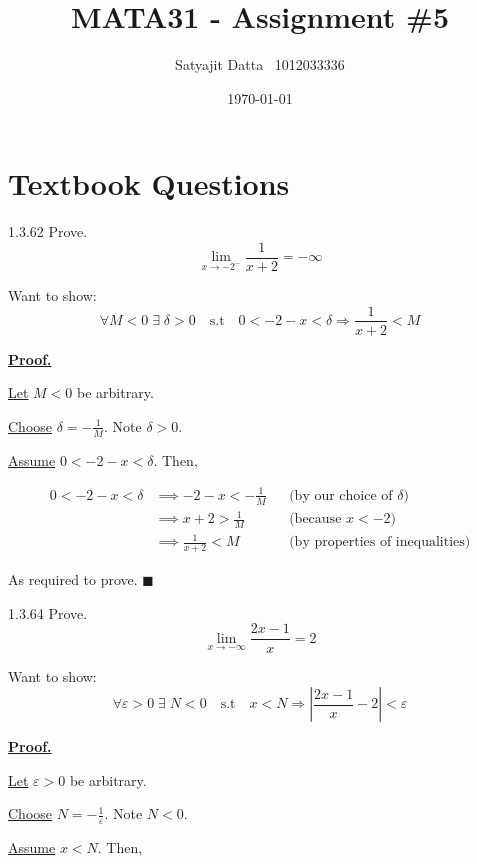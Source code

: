 \documentclass[]{article}
\title{\textbf{MATA31 - Assignment \#5}}
\author{Satyajit Datta \ 1012033336}
\date{\today}
\begin{document}
\maketitle

\section{Textbook Questions}

\begin{question}{1.3.62}
    Prove.
    \[
    \lim_{x\to -2^-} \frac{1}{x+2} = -\infty
    \]
\end{question}
Want to show: 
\[
    \forall M < 0\;\exists\; \delta>0 \quad \text{s.t} \quad 
    0 < -2-x < \delta \Longrightarrow \frac{1}{x+2} < M
\]

\underline{\bf{Proof.}}

\underline{Let} $M < 0$ be arbitrary.

\medbreak

\underline{Choose} $\delta = -\frac{1}{M}$. Note $\delta > 0$.

\medbreak

\underline{Assume} $0 < -2-x < \delta$. Then, 

\begin{align*}
0 < -2 - x < \delta &\implies -2 - x < -\frac{1}{M} 
    && \text{(by our choice of $\delta$)} \\[2mm]
&\implies x + 2 > \frac{1}{M} 
    && \text{(because $x < -2$)} \\[2mm]
&\implies \frac{1}{x+2} < M
    && \text{(by properties of inequalities)}
\end{align*}

As required to prove. $\blacksquare$

\begin{question}{1.3.64}
    Prove.
    \[
    \lim_{x\to -\infty} \frac{2x-1}{x} = 2
    \]
\end{question}

Want to show: 
\[
    \forall \varepsilon > 0\;\exists\; N<0 \quad \text{s.t} \quad 
    x < N \Longrightarrow |\frac{2x-1}{x}-2| < \varepsilon
\]

\underline{\bf{Proof.}}

\underline{Let} $\varepsilon > 0$ be arbitrary.

\medbreak

\underline{Choose} $N = -\frac{1}{\varepsilon}$. Note $N < 0$.

\medbreak

\underline{Assume} $x < N$. Then, 
\end{document}
